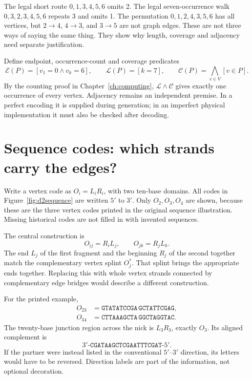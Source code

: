 The legal short route $0,1,3,4,5,6$ omits 2. The legal seven-occurrence walk $0,3,2,3,4,5,6$ repeats 3 and omits 1. The permutation $0,1,2,4,3,5,6$ has all vertices, but $2\to4$, $4\to3$, and $3\to5$ are not graph edges. These are not three ways of saying the same thing. They show why length, coverage and adjacency need separate justification.

Define endpoint, occurrence-count and coverage predicates
\[
\mathcal E(P)=[v_1=0\land v_k=6],\qquad
\mathcal L(P)=[k=7],\qquad
\mathcal C(P)=\bigwedge_{v\in V}[v\in P].
\]
By the counting proof in Chapter~\ref{ch:computing}, $\mathcal L\land\mathcal C$ gives exactly one occurrence of every vertex. Adjacency remains an independent premise. In a perfect encoding it is supplied during generation; in an imperfect physical implementation it must also be checked after decoding.

\section{Sequence codes: which strands carry the edges?}
Write a vertex code as $O_i=L_iR_i$, with two ten-base domains. All codes in Figure~\ref{fig:d2sequence} are written $5'$ to $3'$. Only $O_2,O_3,O_4$ are shown, because these are the three vertex codes printed in the original sequence illustration. Missing historical codes are not filled in with invented sequences.

The central construction is
\[
O_{ij}=R_iL_j,\qquad
O_{jk}=R_jL_k.
\]
The end $L_j$ of the first fragment and the beginning $R_j$ of the second together match the complementary vertex splint $O_j^*$. That splint brings the appropriate ends together. Replacing this with whole vertex strands connected by complementary edge bridges would describe a different construction.

For the printed example,
\[
\begin{aligned}
O_{23}&=\texttt{GTATATCCGA}\,\texttt{GCTATTCGAG},\\
O_{34}&=\texttt{CTTAAAGCTA}\,\texttt{GGCTAGGTAC}.
\end{aligned}
\]
The twenty-base junction region across the nick is $L_3R_3$, exactly $O_3$. Its aligned complement is
\[
3'\text{-}\texttt{CGATAAGCTCGAATTTCGAT}\text{-}5'.
\]
If the partner were instead listed in the conventional $5'$--$3'$ direction, its letters would have to be reversed. Direction labels are part of the information, not optional decoration.


